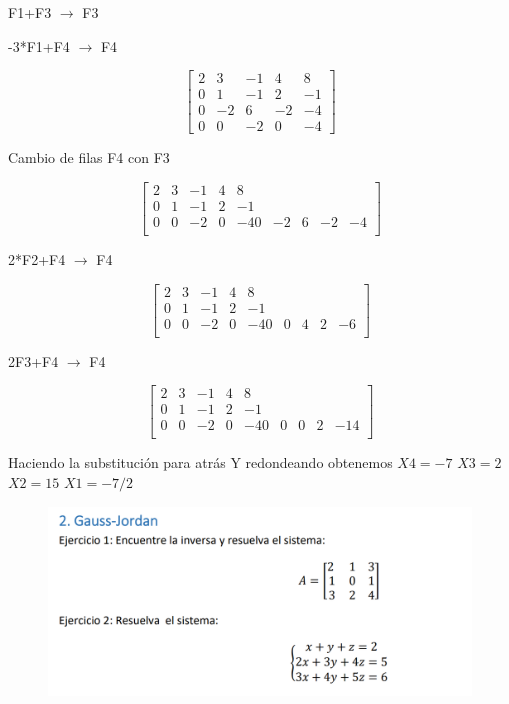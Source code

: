 \documentclass[12pt]{article}
\begin{document}
F1+F3 $\longrightarrow $ F3

-3*F1+F4 $\longrightarrow $ F4

\[
\begin{bmatrix}
2 & 3 & -1 & 4 & 8\\
0 & 1 & -1 & 2 & -1 \\
0 & -2 & 6 & -2 & -4 \\
0 & 0 & -2 & 0 & -4
\end{bmatrix}
\]

Cambio de filas F4 con F3

\[
\begin{bmatrix}
2 & 3 & -1 & 4 & 8\\
0 & 1 & -1 & 2 & -1 \\
0 & 0 & -2 & 0 & -4
0 & -2 & 6 & -2 & -4 \\

\end{bmatrix}
\]

2*F2+F4 $\longrightarrow $ F4


\[
\begin{bmatrix}
2 & 3 & -1 & 4 & 8\\
0 & 1 & -1 & 2 & -1 \\
0 & 0 & -2 & 0 & -4
0 & 0 & 4 & 2 & -6 \\

\end{bmatrix}
\]

2F3+F4 $\longrightarrow $ F4

\[
\begin{bmatrix}
2 & 3 & -1 & 4 & 8\\
0 & 1 & -1 & 2 & -1 \\
0 & 0 & -2 & 0 & -4
0 & 0 & 0 & 2 & -14 \\

\end{bmatrix}
\]

Haciendo la substitución para atrás Y redondeando obtenemos
$X4 = -7$ $X3 = 2$    $X2 = 15$  $X1 = -7/2$ 


\begin{figure}[H]
\includegraphics[width=1\textwidth]{./inFiles/Figures/Ej2.png}
\end{figure}
\end{document}
